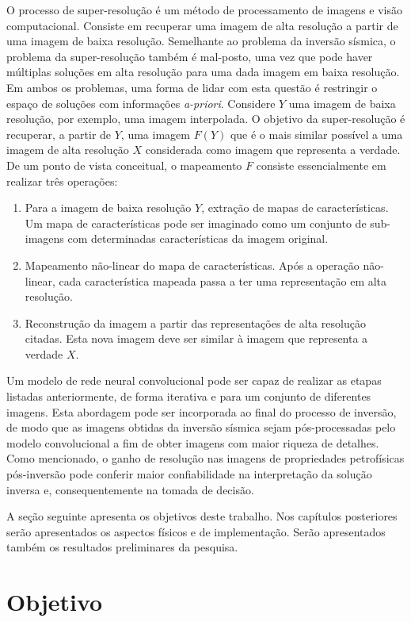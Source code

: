 O processo de super-resolução é um método de processamento de imagens e visão computacional.
Consiste em recuperar uma imagem de alta resolução a partir de uma imagem
de baixa resolução. Semelhante ao problema da inversão sísmica, o problema da super-resolução
também é mal-posto, uma vez que pode haver múltiplas soluções em alta resolução para uma dada imagem em baixa
resolução. Em ambos os problemas, uma forma de lidar com esta questão é restringir o espaço
de soluções com informações \textit{a-priori}. 
Considere $Y$ uma imagem de baixa resolução, por exemplo, uma
imagem interpolada. O objetivo da super-resolução é
recuperar, a partir de $Y$, uma imagem $F(Y)$ que é
o mais similar possível a uma imagem de alta resolução $X$
considerada como imagem que representa a verdade.
De um ponto de vista conceitual, o mapeamento $F$ consiste essencialmente em
realizar três operações:
\begin{enumerate}
 \item Para a imagem de baixa resolução $Y$, extração de mapas de características. Um mapa de características
 pode ser imaginado como um conjunto de sub-imagens com determinadas características da imagem original.
 \item Mapeamento não-linear do mapa de características. Após a operação não-linear, cada característica mapeada
 passa a ter uma representação em alta resolução.
 \item Reconstrução da imagem a partir das representações de alta resolução citadas. Esta nova imagem
 deve ser similar à imagem que representa a verdade $X$.
\end{enumerate}

Um modelo de rede neural convolucional pode ser capaz de realizar as etapas listadas anteriormente,
de forma iterativa e para um conjunto de diferentes imagens.
Esta abordagem pode ser incorporada ao final do processo de inversão, de modo que as
imagens obtidas da inversão sísmica sejam pós-processadas pelo modelo convolucional
a fim de obter imagens com maior riqueza de detalhes. Como mencionado, o ganho de resolução
nas imagens de propriedades petrofísicas pós-inversão pode conferir maior confiabilidade
na interpretação da solução inversa e, consequentemente na tomada de decisão.

A seção seguinte apresenta os objetivos deste trabalho. Nos capítulos posteriores
serão apresentados os aspectos físicos e de implementação. Serão
apresentados também os resultados preliminares da pesquisa.

\section{Objetivo}

